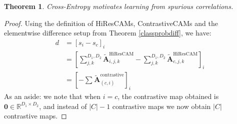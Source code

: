 \documentclass{article}
\theoremstyle{plain}
\newtheorem{theorem}{Theorem}[section]
\theoremstyle{definition}
\theoremstyle{remark}
\begin{document}
\begin{theorem}\label{ce-spur-corr}
	Cross-Entropy motivates learning from spurious correlations.
\end{theorem}
\begin{proof} Using the definition of HiResCAMs, ContrastiveCAMs and the elementwise difference setup from Theorem \ref{classprobdiff}, we have:
	\begin{align}
		d &= [s_i - s_c]_i \\
		&= \left[\sum^{D_1,D_2}_{j,k} \tilde{\mathcal{\bm{A}}}_{i,j,k}^{\text{HiResCAM}} - \sum^{D_1,D_2}_{j,k} \tilde{\mathcal{\bm{A}}}_{c,j,k}^{\text{HiResCAM}}\right]_i \\
		&= \left[ -\sum^{}\tilde{\mathcal{\bm{A}}}^{\text{contrastive}}_{(c, i)} \right]_i
	\end{align}
	As an aside: we note that when $i = c$, the contrastive map obtained is $\bm{0} \in \mathbb{R}^{D_1 \times D_2}$, and instead of $|C| - 1$ contrastive maps we now obtain $|C|$ contrastive maps.


\end{proof}
\end{document}
